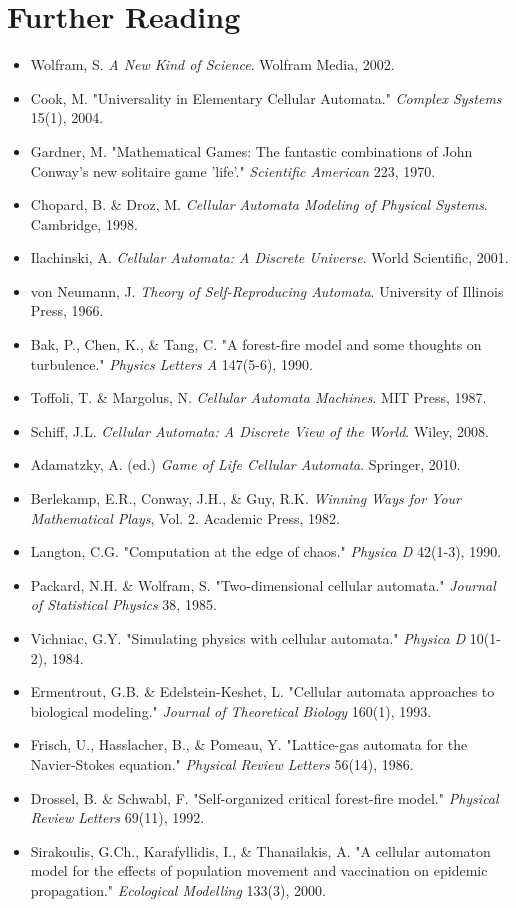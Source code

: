 \documentclass[a4paper, 11pt]{article}
\begin{document}
\section*{Further Reading}

\begin{itemize}
\item Wolfram, S. \textit{A New Kind of Science}. Wolfram Media, 2002.
\item Cook, M. "Universality in Elementary Cellular Automata." \textit{Complex Systems} 15(1), 2004.
\item Gardner, M. "Mathematical Games: The fantastic combinations of John Conway's new solitaire game 'life'." \textit{Scientific American} 223, 1970.
\item Chopard, B. \& Droz, M. \textit{Cellular Automata Modeling of Physical Systems}. Cambridge, 1998.
\item Ilachinski, A. \textit{Cellular Automata: A Discrete Universe}. World Scientific, 2001.
\item von Neumann, J. \textit{Theory of Self-Reproducing Automata}. University of Illinois Press, 1966.
\item Bak, P., Chen, K., \& Tang, C. "A forest-fire model and some thoughts on turbulence." \textit{Physics Letters A} 147(5-6), 1990.
\item Toffoli, T. \& Margolus, N. \textit{Cellular Automata Machines}. MIT Press, 1987.
\item Schiff, J.L. \textit{Cellular Automata: A Discrete View of the World}. Wiley, 2008.
\item Adamatzky, A. (ed.) \textit{Game of Life Cellular Automata}. Springer, 2010.
\item Berlekamp, E.R., Conway, J.H., \& Guy, R.K. \textit{Winning Ways for Your Mathematical Plays}, Vol. 2. Academic Press, 1982.
\item Langton, C.G. "Computation at the edge of chaos." \textit{Physica D} 42(1-3), 1990.
\item Packard, N.H. \& Wolfram, S. "Two-dimensional cellular automata." \textit{Journal of Statistical Physics} 38, 1985.
\item Vichniac, G.Y. "Simulating physics with cellular automata." \textit{Physica D} 10(1-2), 1984.
\item Ermentrout, G.B. \& Edelstein-Keshet, L. "Cellular automata approaches to biological modeling." \textit{Journal of Theoretical Biology} 160(1), 1993.
\item Frisch, U., Hasslacher, B., \& Pomeau, Y. "Lattice-gas automata for the Navier-Stokes equation." \textit{Physical Review Letters} 56(14), 1986.
\item Drossel, B. \& Schwabl, F. "Self-organized critical forest-fire model." \textit{Physical Review Letters} 69(11), 1992.
\item Sirakoulis, G.Ch., Karafyllidis, I., \& Thanailakis, A. "A cellular automaton model for the effects of population movement and vaccination on epidemic propagation." \textit{Ecological Modelling} 133(3), 2000.
\end{itemize}
\end{document}
